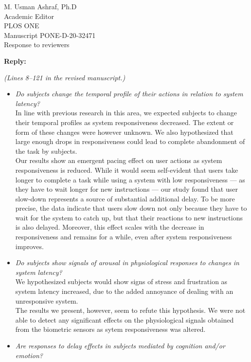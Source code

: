\documentclass[10pt, letterpaper]{letter}
\newenvironment{QandA}
{\begin{enumerate}[
    label={\bfseries Comment \arabic*:}, 
    wide,
    ref={Comment \arabic*}]}
{\end{enumerate}}
\newenvironment{revised}[2]
{%
\begin{displayquote}
    \medskip
    \begin{flushright}
        \itshape{(Lines \numrange{#1}{#2} in the revised manuscript.)}\normalfont%
    \end{flushright}
    \medskip

}
{\end{displayquote}}
\newenvironment{answered}
{\medskip\par\bfseries Reply: \normalfont}
{\par\noindent\makebox[\linewidth]{\rule{\textwidth}{0.4pt}}\bigskip}
\begin{document}
\begin{letter}{
    M. Usman Ashraf, Ph.D\\
    Academic Editor\\
    PLOS ONE\\
    \medskip
    Manuscript PONE-D-20-32471\\
    Response to reviewers\\
}
\begin{QandA}
\begin{answered}
\begin{revised}{8}{121}
            \begin{itemize}
            \item \emph{Do subjects change the temporal profile of their actions in relation to system latency?}\\

            In line with previous research in this area, we expected subjects to change their temporal profiles as system responsiveness decreased.
            The extent or form of these changes were however unknown.
            We also hypothesized that large enough drops in responsiveness could lead to complete abandonment of the task by subjects.\\

            Our results show an emergent pacing effect on user actions as system responsiveness is reduced.
            While it would seem self-evident that users take longer to complete a task while using a system with low responsiveness --- as they have to wait longer for new instructions --- our study found that user slow-down represents a source of substantial additional delay.
            To be more precise, the data indicate that users slow down not only because they have to wait for the system to catch up, but that their reactions to new instructions is also delayed.
            Moreover, this effect scales with the decrease in responsiveness and remains for a while, even after system responsiveness improves.\\
            
            \item \emph{Do subjects show signals of arousal in physiological responses to changes in system latency?}\\
            
            We hypothesized subjects would show signs of stress and frustration as system latency increased, due to the added annoyance of dealing with an unresponsive system.\\

            The results we present, however, seem to refute this hypothesis. 
            We were not able to detect any significant effects on the physiological signals obtained from the biometric sensors as sytem responsiveness was altered.\\
            
            \item \emph{Are responses to delay effects in subjects mediated by cognition and/or emotion?}\\
            

\end{itemize}
\end{revised}
\end{answered}
\end{QandA}
\end{letter}
\end{document}
